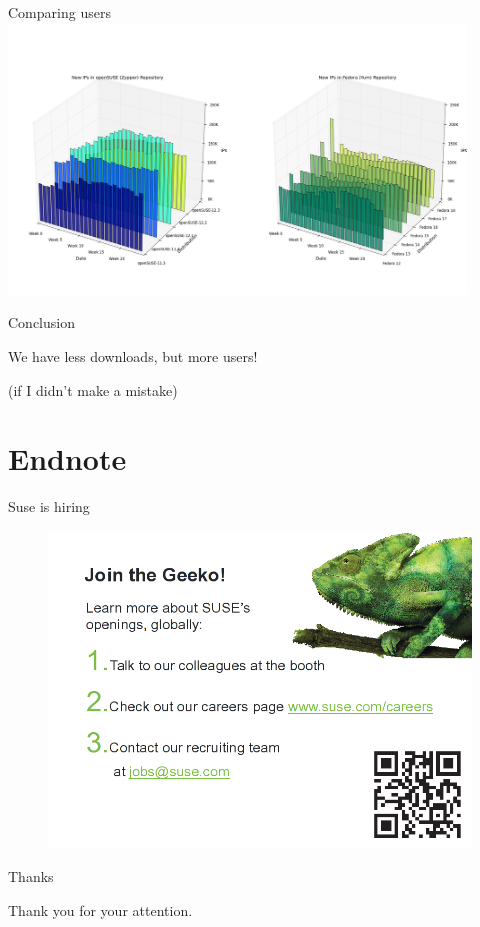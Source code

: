 \documentclass{beamer}
\begin{document}
\begin{frame}{Comparing users}
  \includegraphics[height=7.2cm]{opensuse_fedora_users}
\end{frame}

\begin{frame}{Conclusion}
  \begin{center}
    \begin{huge}
      We have less downloads, but more users!
    \end{huge}
  \end{center}
  \begin{center}
    (if I didn't make a mistake)
  \end{center}
\end{frame}


\section{Endnote}

\begin{frame}{Suse is hiring}
  \begin{figure}
    \includegraphics[width= 0.8\linewidth]{suse_hiring.png}
  \end{figure}
\end{frame}

\begin{frame}{Thanks}
  \begin{center}
    Thank you for your attention.
  \end{center}
\end{frame}
\end{document}
